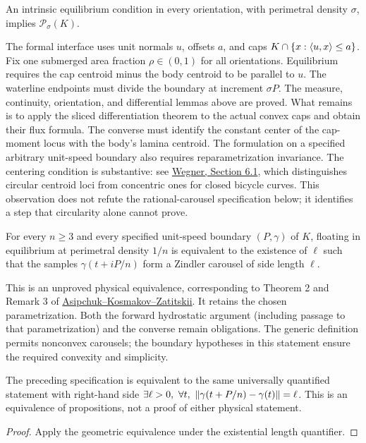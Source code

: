 \begin{proposition}
\label{prop:physical}
An intrinsic equilibrium condition in every orientation, with perimetral
density $\sigma$, implies $\mathcal P_\sigma(K)$.
\end{proposition}
The formal interface uses unit normals $u$, offsets $a$, and caps
$K\cap\{x:\langle u,x\rangle\leq a\}$. Fix one submerged area fraction
$\rho\in(0,1)$ for all orientations. Equilibrium requires the cap centroid
minus the body centroid to be parallel to $u$. The waterline endpoints
must divide the boundary at increment $\sigma P$. The measure, continuity,
orientation, and differential lemmas above are proved. What remains is to
apply the sliced differentiation theorem to the actual convex caps and obtain
their flux formula. The converse must identify the constant center of the
cap-moment locus with the body's lamina centroid. The formulation on a
specified arbitrary unit-speed boundary also requires reparametrization invariance.
The centering condition is substantive: see
\href{https://arxiv.org/pdf/1909.12596\#page=44}{Wegner, Section 6.1},
which distinguishes circular centroid loci from concentric ones for closed
bicycle curves. This observation does not refute the rational-carousel
specification below; it identifies a step that circularity alone cannot prove.

\begin{proposition}
\label{prop:zindler-physical}
For every $n\geq3$ and every specified unit-speed boundary $(P,\gamma)$
of $K$, floating in equilibrium at perimetral density $1/n$ is equivalent
to the existence of $\ell$ such that the samples $\gamma(t+iP/n)$ form
a Zindler carousel of side length $\ell$.
\end{proposition}
This is an unproved physical equivalence, corresponding to Theorem 2 and
Remark 3 of
\href{https://arxiv.org/pdf/2604.10330}{Asipchuk--Kosmakov--Zatitskii}.
It retains the chosen parametrization. Both the forward hydrostatic argument
(including passage to that parametrization) and the converse remain obligations.
The generic definition permits nonconvex carousels; the boundary hypotheses
in this statement ensure the required convexity and simplicity.

\begin{lemma}
\label{lem:zindler-specification}
\leanok
{}
The preceding specification is equivalent to the same universally quantified
statement with right-hand side
$\exists\ell>0,\ \forall t,\ \norm{\gamma(t+P/n)-\gamma(t)}=\ell$.
This is an equivalence of propositions, not a proof of either physical statement.
\end{lemma}
\begin{proof}
\leanok
Apply the geometric equivalence under the existential length quantifier.
\end{proof}

